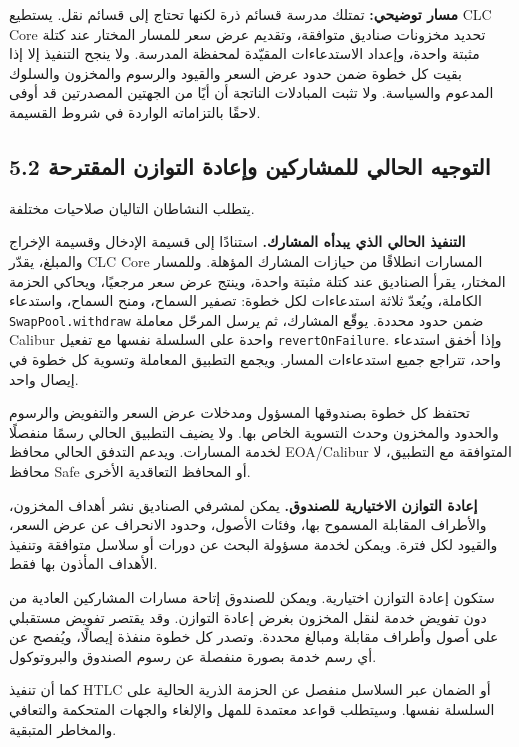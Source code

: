 \documentclass[11pt]{article}
\begin{document}
\textbf{مسار توضيحي:} تمتلك مدرسة قسائم ذرة لكنها تحتاج إلى قسائم نقل. يستطيع CLC Core تحديد مخزونات صناديق متوافقة، وتقديم عرض سعر للمسار المختار عند كتلة مثبتة واحدة، وإعداد الاستدعاءات المقيّدة لمحفظة المدرسة. ولا ينجح التنفيذ إلا إذا بقيت كل خطوة ضمن حدود عرض السعر والقيود والرسوم والمخزون والسلوك المدعوم والسياسة. ولا تثبت المبادلات الناتجة أن أيًا من الجهتين المصدرتين قد أوفى لاحقًا بالتزاماته الواردة في شروط القسيمة.

\subsection*{5.2 التوجيه الحالي للمشاركين وإعادة التوازن المقترحة}

يتطلب النشاطان التاليان صلاحيات مختلفة.

\textbf{التنفيذ الحالي الذي يبدأه المشارك.} استنادًا إلى قسيمة الإدخال وقسيمة الإخراج والمبلغ، يقدّر CLC Core المسارات انطلاقًا من حيازات المشارك المؤهلة. وللمسار المختار، يقرأ الصناديق عند كتلة مثبتة واحدة، وينتج عرض سعر مرجعيًا، ويحاكي الحزمة الكاملة، ويُعدّ ثلاثة استدعاءات لكل خطوة: تصفير السماح، ومنح السماح، واستدعاء \texttt{SwapPool.withdraw} ضمن حدود محددة. يوقّع المشارك، ثم يرسل المرحّل معاملة Calibur واحدة على السلسلة نفسها مع تفعيل \texttt{revertOnFailure}. وإذا أخفق استدعاء واحد، تتراجع جميع استدعاءات المسار. ويجمع التطبيق المعاملة وتسوية كل خطوة في إيصال واحد.

تحتفظ كل خطوة بصندوقها المسؤول ومدخلات عرض السعر والتفويض والرسوم والحدود والمخزون وحدث التسوية الخاص بها. ولا يضيف التطبيق الحالي رسمًا منفصلًا لخدمة المسارات. ويدعم التدفق الحالي محافظ EOA/Calibur المتوافقة مع التطبيق، لا محافظ Safe أو المحافظ التعاقدية الأخرى.

\textbf{إعادة التوازن الاختيارية للصندوق.} يمكن لمشرفي الصناديق نشر أهداف المخزون، والأطراف المقابلة المسموح بها، وفئات الأصول، وحدود الانحراف عن عرض السعر، والقيود لكل فترة. ويمكن لخدمة مسؤولة البحث عن دورات أو سلاسل متوافقة وتنفيذ الأهداف المأذون بها فقط.

ستكون إعادة التوازن اختيارية. ويمكن للصندوق إتاحة مسارات المشاركين العادية من دون تفويض خدمة لنقل المخزون بغرض إعادة التوازن. وقد يقتصر تفويض مستقبلي على أصول وأطراف مقابلة ومبالغ محددة. وتصدر كل خطوة منفذة إيصالًا، ويُفصح عن أي رسم خدمة بصورة منفصلة عن رسوم الصندوق والبروتوكول.

كما أن تنفيذ HTLC أو الضمان عبر السلاسل منفصل عن الحزمة الذرية الحالية على السلسلة نفسها. وسيتطلب قواعد معتمدة للمهل والإلغاء والجهات المتحكمة والتعافي والمخاطر المتبقية.
\end{document}
